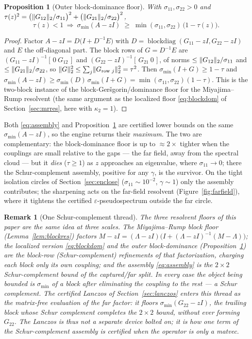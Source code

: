 \documentclass[11pt]{article}
\newtheorem{proposition}[theorem]{Proposition}
\newtheorem{remark}[theorem]{Remark}
\newcommand{\sig}{\sigma}
\newcommand{\sigmin}{\sigma_{\min}}
\DeclarePairedDelimiter{\norm}{\lVert}{\rVert}
\begin{document}
\begin{proposition}[Outer block-dominance floor]\label{prop:outerbdom}
With $\sig_{11},\sig_{22}>0$ and $\tau(z)^2=\big(\norm{G_{12}}_2/\sig_{11}\big)^2+\big(\norm{G_{21}}_2/\sig_{22}\big)^2$,
\[
  \tau(z)<1\ \Longrightarrow\ \sigmin(A-zI)\;\ge\;\min(\sig_{11},\sig_{22})\,\big(1-\tau(z)\big).
\]
\end{proposition}
\begin{proof}
Factor $A-zI=D\big(I+D^{-1}E\big)$ with $D=\operatorname{blockdiag}(G_{11}-zI,G_{22}-zI)$ and $E$ the
off-diagonal part. The block rows of $G=D^{-1}E$ are $(G_{11}-zI)^{-1}[\,0\ G_{12}\,]$ and
$(G_{22}-zI)^{-1}[\,G_{21}\ 0\,]$, of norms $\le\norm{G_{12}}_2/\sig_{11}$ and $\le\norm{G_{21}}_2/\sig_{22}$,
so $\norm{G}_2^2\le\sum_j\norm{G_{\text{row }j}}_2^2=\tau^2$. Then $\sigmin(I+G)\ge1-\tau$ and
$\sigmin(A-zI)\ge\sigmin(D)\,\sigmin(I+G)=\min(\sig_{11},\sig_{22})(1-\tau)$. This is the two-block
instance of the block-Ger\v sgorin/dominance floor for the Miyajima--Rump resolvent (the same argument
as the localized floor \eqref{eq:blockdom} of Section~\ref{sec:mrres}, here with $\kappa_2=1$).
\end{proof}

Both \eqref{eq:assembly} and Proposition~\ref{prop:outerbdom} are certified lower bounds on the same
$\sigmin(A-zI)$, so the engine returns their \emph{maximum}. The two are complementary: the
block-dominance floor is up to $\approx2\times$ tighter when the couplings are small relative to the
gaps --- the far field, away from the spectral cloud --- but it \emph{dies} ($\tau\ge1$) as $z$
approaches an eigenvalue, where $\sig_{11}\to0$; there the Schur-complement assembly, positive for any
$\gamma$, is the survivor. On the tight isolation circles of Section~\ref{sec:enclose}
($\sig_{11}\sim10^{-2}$, $\gamma\sim1$) only the assembly contributes; the sharpening acts on the
far-field resolvent (Figure~\ref{fig:farfield}), where it tightens the certified $\varepsilon$-pseudospectrum
outside the far circle.

\begin{remark}[One Schur-complement thread]\label{rem:schur}
The three resolvent floors of this paper are the same idea at three scales. The Miyajima--Rump block
floor (Lemma~\ref{lem:blockres}) factors $M-zI=(\Lambda-zI)\big(I+(\Lambda-zI)^{-1}(M-\Lambda)\big)$;
the localized version \eqref{eq:blockdom} and the outer block-dominance
(Proposition~\ref{prop:outerbdom}) are the block-row (Schur-complement) refinements of that
factorization, charging each block only its own coupling; and the assembly \eqref{eq:assembly} is the
$2\times2$ Schur-complement bound of the captured/far split. In every case the object being bounded is
$\sigmin$ of a block after eliminating the coupling to the rest --- a Schur complement. The certified
Lanczos of Section~\ref{sec:lanczos} enters this thread as the \emph{matrix-free evaluation of the far
factor}: it floors $\sigmin(G_{22}-zI)$, the trailing block whose Schur complement completes the
$2\times2$ bound, without ever forming $G_{22}$. The Lanczos is thus not a separate device bolted on;
it is how one term of the Schur-complement assembly is certified when the operator is only a matvec.
\end{remark}
\end{document}
